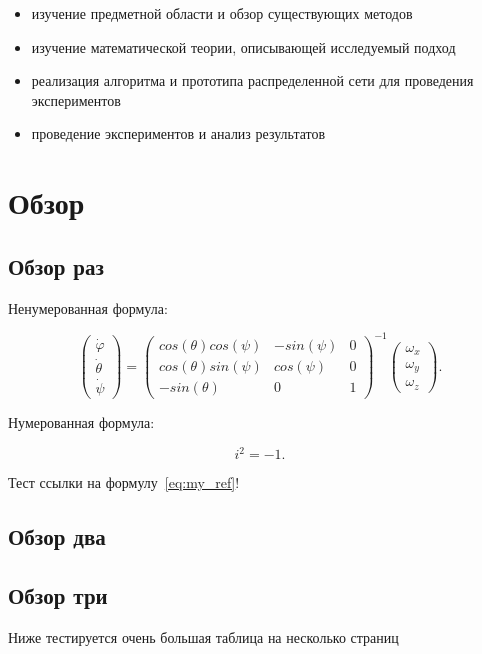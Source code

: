 \documentclass[a4paper,article,14pt]{extarticle}
\begin{document}
\begin{itemize}
  \item изучение предметной области и обзор существующих методов
  \item изучение математической теории, описывающей исследуемый подход
  \item реализация алгоритма и прототипа распределенной сети для проведения экспериментов
  \item проведение экспериментов и анализ результатов
\end{itemize}
\pagebreak

\section{Обзор}
\subsection{Обзор раз}
Ненумерованная формула:

\begin{equation}
    \begin{pmatrix} \dot{\varphi}\\ \dot{\theta} \\ \dot{\psi} \end{pmatrix}
    = \begin{pmatrix}
        cos(\theta)cos(\psi) & -sin(\psi) & 0 \\
        cos(\theta)sin(\psi) & cos(\psi)  & 0 \\
        -sin(\theta)         & 0         &  1
    \end{pmatrix}^{-1}
    \begin{pmatrix} \omega_x\\ \omega_y \\ \omega_z \end{pmatrix}.
\end{equation}

Нумерованная формула:

\begin{equation} \label{eq:my_ref}
    i^2 = -1.
\end{equation}

Тест ссылки на формулу~\ref{eq:my_ref}!

\subsection{Обзор два}

\subsection{Обзор три}
Ниже тестируется очень большая таблица на несколько страниц
\end{document}
